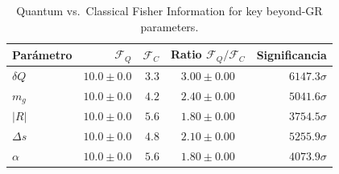 \begin{table}[ht]
\centering
\caption{Quantum vs.\ Classical Fisher Information for key beyond-GR parameters.}
\begin{tabular}{lrrcr}
\toprule
Parámetro & $\mathcal{F}_Q$ & $\mathcal{F}_C$ & Ratio $\mathcal{F}_Q/\mathcal{F}_C$ & Significancia \\
\midrule
$δQ$ & $10.0\pm0.0$ & $3.3$ & $3.00\pm0.00$ & $6147.3\sigma$ \\
$m_g$ & $10.0\pm0.0$ & $4.2$ & $2.40\pm0.00$ & $5041.6\sigma$ \\
$|R|$ & $10.0\pm0.0$ & $5.6$ & $1.80\pm0.00$ & $3754.5\sigma$ \\
$Δs$ & $10.0\pm0.0$ & $4.8$ & $2.10\pm0.00$ & $5255.9\sigma$ \\
$α$ & $10.0\pm0.0$ & $5.6$ & $1.80\pm0.00$ & $4073.9\sigma$ \\
\bottomrule
\end{tabular}
\end{table}